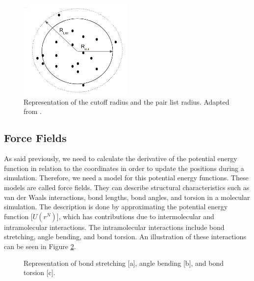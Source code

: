 \begin{figure}
	\centering
	\includegraphics[width=0.5\textwidth]{Figures/pairlist}
	\caption{Representation of the cutoff radius and the pair list radius. Adapted from .}
	\label{fig:pairlist}
\end{figure}
\FloatBarrier
\subsection{Force Fields }
As said previously, we need to calculate the derivative of the potential energy function in relation to the coordinates in order to update the positions during a simulation. Therefore, we need a model for this potential energy functions. These models are called force fields. They can describe structural characteristics such as van der Waals interactions, bond lengths, bond angles, and torsion in a molecular simulation. The description is done by approximating the potential energy function [$U(r^N)$], which has contributions due to intermolecular and intramolecular interactions. The intramolecular interactions include bond stretching, angle bending, and bond torsion. An illustration of these interactions can be seen in Figure \ref{fig:intraint}. 

\begin{figure}[H]
	\caption{Representation of bond stretching [a], angle bending [b], and bond torsion [c].}%
	\label{fig:intraint}%
\end{figure}


